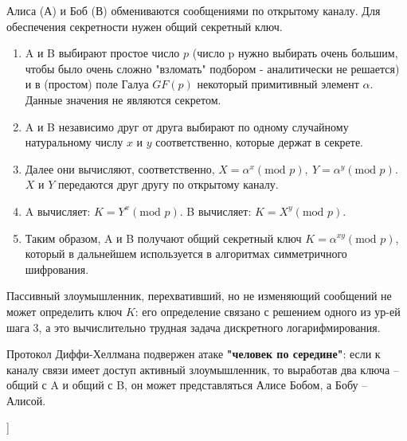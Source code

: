 Алиса (А) и Боб (В) обмениваются сообщениями по открытому каналу.
Для обеспечения секретности нужен общий секретный ключ.
\begin{enumerate}
    \item A и B выбирают простое число $p$ (число p нужно выбирать очень большим, чтобы было очень сложно "взломать" подбором - аналитически не решается) и в (простом) поле Галуа $GF(p)$ некоторый примитивный элемент $\alpha$.
    Данные значения не являются секретом.
    \item A и B независимо друг от друга выбирают по одному случайному натуральному числу $x$ и $y$ соответственно, которые держат в секрете.
    \item Далее они вычисляют, соответственно, $X = \alpha^x (\text{mod } p),~Y = \alpha^y (\text{mod } p)$.
    $X$ и $Y$ передаются друг другу по открытому каналу.
    \item A вычисляет: $K = Y^x (\text{mod } p)$.
    B вычисляет: $K = X^y (\text{mod } p)$.
    \item Таким образом, A и B получают общий секретный ключ $K = \alpha^{xy} (\text{mod } p)$, который в дальнейшем используется в алгоритмах симметричного шифрования.
\end{enumerate}

Пассивный злоумышленник, перехвативший, но не изменяющий сообщений не может определить ключ $K$: его определение связано с решением одного из ур-ей шага 3, а это вычислительно трудная задача дискретного логарифмирования.

Протокол Диффи-Хеллмана подвержен атаке \textbf{"человек по середине"}: если к каналу связи имеет доступ активный злоумышленник, то выработав два ключа -- общий с A и общий с B, он может представляться Алисе Бобом, а Бобу -- Алисой.

\bigbreak
[\cite[page 139-151]{gurov}]
